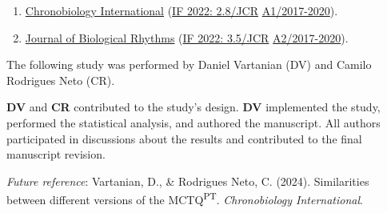 \documentclass[
12pt,
openright,
oneside,
a4paper,
chapter=TITLE,
section=TITLE,
french,
spanish,
brazil,
english
]{abntex2}\usepackage{array}
\newcommand{\microskip}{\vspace{\microskipamount}}
\begin{document}
\begin{tcolorbox}[enhanced jigsaw, colframe=quarto-callout-note-color-frame, coltitle=black, opacityback=0, left=2mm, opacitybacktitle=0.6, rightrule=.15mm, leftrule=.75mm, colbacktitle=quarto-callout-note-color!10!white, titlerule=0mm, title=\textcolor{quarto-callout-note-color}{\faInfo}\hspace{0.5em}{Target journal}, colback=white, breakable, bottomtitle=1mm, toptitle=1mm, arc=.35mm, bottomrule=.15mm, toprule=.15mm]

\begin{enumerate}
\def\labelenumi{\arabic{enumi}.}
\tightlist
\item
  \href{https://www.tandfonline.com/action/authorSubmission?show=instructions&journalCode=icbi20}{Chronobiology
  International} (\href{https://jcr.clarivate.com/jcr/}{IF 2022:
  2.8/JCR} \textbar{}
  \href{https://sucupira.capes.gov.br/sucupira/public/consultas/coleta/veiculoPublicacaoQualis/listaConsultaGeralPeriodicos.jsf}{A1/2017-2020}).
\item
  \href{https://journals.sagepub.com/author-instructions/JBR}{Journal of
  Biological Rhythms} (\href{https://jcr.clarivate.com/jcr/}{IF 2022:
  3.5/JCR} \textbar{}
  \href{https://sucupira.capes.gov.br/sucupira/public/consultas/coleta/veiculoPublicacaoQualis/listaConsultaGeralPeriodicos.jsf}{A2/2017-2020}).
\end{enumerate}

\end{tcolorbox}

\begin{tcolorbox}[enhanced jigsaw, colframe=quarto-callout-note-color-frame, coltitle=black, opacityback=0, left=2mm, opacitybacktitle=0.6, rightrule=.15mm, leftrule=.75mm, colbacktitle=quarto-callout-note-color!10!white, titlerule=0mm, title=\textcolor{quarto-callout-note-color}{\faInfo}\hspace{0.5em}{Note}, colback=white, breakable, bottomtitle=1mm, toptitle=1mm, arc=.35mm, bottomrule=.15mm, toprule=.15mm]

The following study was performed by Daniel Vartanian (DV) and Camilo
Rodrigues Neto (CR).

\microskip

\textbf{DV} and \textbf{CR} contributed to the study's design.
\textbf{DV} implemented the study, performed the statistical analysis,
and authored the manuscript. All authors participated in discussions
about the results and contributed to the final manuscript revision.

\microskip

\emph{Future reference}: Vartanian, D., \& Rodrigues Neto, C. (2024).
Similarities between different versions of the MCTQ\textsuperscript{PT}.
\emph{Chronobiology International}.

\end{tcolorbox}
\end{document}
